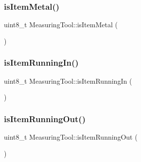 \hypertarget{class_measuring_tool_a1d98ab82733fbdee6e63f880a8ace322}{}\label{class_measuring_tool_a1d98ab82733fbdee6e63f880a8ace322} 
\subsubsection{\texorpdfstring{is\+Item\+Metal()}{isItemMetal()}}
{\footnotesize\ttfamily uint8\+\_\+t Measuring\+Tool\+::is\+Item\+Metal (\begin{DoxyParamCaption}{ }\end{DoxyParamCaption})}

\hypertarget{class_measuring_tool_a1749a84c95ae88ef6e8e65edfa2204bc}{}\label{class_measuring_tool_a1749a84c95ae88ef6e8e65edfa2204bc} 
\subsubsection{\texorpdfstring{is\+Item\+Running\+In()}{isItemRunningIn()}}
{\footnotesize\ttfamily uint8\+\_\+t Measuring\+Tool\+::is\+Item\+Running\+In (\begin{DoxyParamCaption}{ }\end{DoxyParamCaption})}

\hypertarget{class_measuring_tool_a0941de19234c2026359e4cc973f7bb1b}{}\label{class_measuring_tool_a0941de19234c2026359e4cc973f7bb1b} 
\subsubsection{\texorpdfstring{is\+Item\+Running\+Out()}{isItemRunningOut()}}
{\footnotesize\ttfamily uint8\+\_\+t Measuring\+Tool\+::is\+Item\+Running\+Out (\begin{DoxyParamCaption}{ }\end{DoxyParamCaption})}

\hypertarget{class_measuring_tool_a25d27399efb7e1a0daceeb270e9c26cc}{}\label{class_measuring_tool_a25d27399efb7e1a0daceeb270e9c26cc} 
